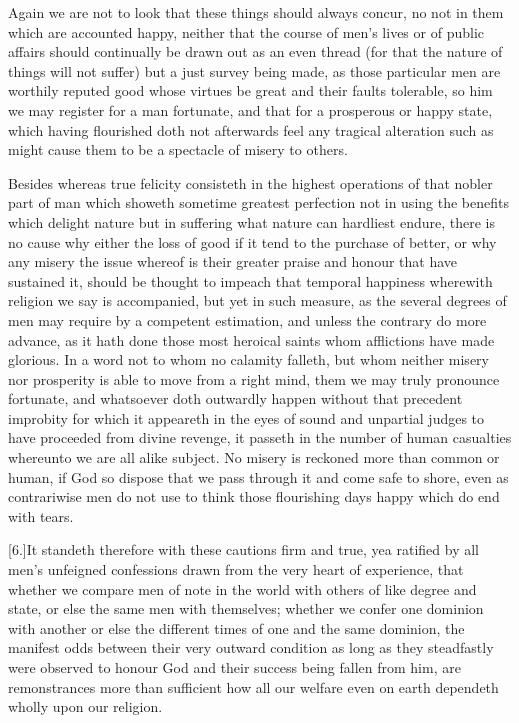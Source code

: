 Again we are not to look that these things should always concur, no not in them which are accounted happy, neither that the course of men’s lives or of public affairs should continually be drawn out as an even thread (for that the nature of things will not suffer) but a just survey being made, as those particular men are worthily reputed good whose virtues be great and their faults tolerable, so him we may register for a man fortunate, and that for a prosperous or happy state, which having flourished doth not afterwards feel any tragical alteration such as might cause them to be a spectacle of misery to others.

Besides whereas true felicity consisteth in the highest operations of that nobler part of man which showeth sometime greatest perfection not in using the benefits which delight nature but in suffering what nature can hardliest endure, there is no cause why either the loss of good if it tend to the purchase of better, or why any misery the issue whereof is their greater praise and honour that have sustained it, should be thought to impeach that temporal happiness wherewith religion we say is accompanied, but yet in such measure, as the several degrees of men may require by a competent estimation, and unless the contrary do more advance, as it hath done those most heroical saints whom afflictions have made glorious. In a word not to whom no calamity falleth, but whom neither misery nor prosperity is able to move from a right mind, them we may truly pronounce fortunate, and whatsoever doth outwardly happen without that precedent improbity for which it appeareth in the eyes of sound and unpartial judges to have proceeded from divine revenge, it passeth in the number of human casualties whereunto we are all alike subject. No misery is reckoned more than common or human, if God so dispose that we pass through it and come safe to shore, even as contrariwise men do not use to think those flourishing days happy which do end with tears.

[6.]It standeth therefore with these cautions firm and true, yea ratified by all men’s unfeigned confessions drawn from the very heart of experience, that whether we compare men of note in the world with others of like degree and state,  or else the same men with themselves;
 whether we confer one dominion with another or else the different times of one and the same dominion, the manifest odds between their very outward condition as long as they steadfastly were observed to honour God and their success being fallen from him, are remonstrances more than sufficient how all our welfare even on earth dependeth wholly upon our religion.

